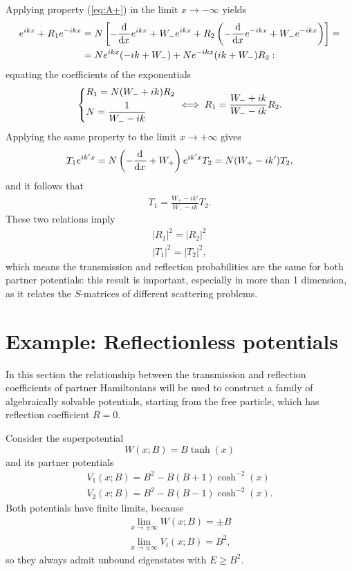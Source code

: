  Applying property (\ref{eq:A+}) in the limit $x\to-\infty$ yields
\begin{gather*}
e^{ikx}+R_1e^{-ikx} = N\left[-\dv[]{}{x}e^{ikx}+W_-e^{ikx} + R_2\left(
-\dv[]{}{x}e^{-ikx}+W_-e^{-ikx}\right)\right]=\\
=Ne^{ikx}(-ik+W_-)+Ne^{-ikx}(ik+W_-)R_2:
\end{gather*}
equating the coefficients of the exponentials
\begin{equation}
\begin{dcases*}
R_1=N(W_-+ik)R_2\\
N=\frac{1}{W_--ik}
\end{dcases*} \iff R_1 = \frac{W_-+ik}{W_--ik}R_2.
\label{eq:refl}
\end{equation}
Applying the same property to the limit $x\to+\infty$ gives
$$T_1e^{ik'x} = N\left(-\dv[]{}{x}+W_+\right)e^{ik'x}T_2 = N(W_+-ik')T_2,$$
and it follows that
\begin{gather}
T_1 = \frac{W_+-ik'}{W_--ik}T_2.
\label{eq:trans}
\end{gather}
 These two relations imply
\begin{gather*}
|R_1|^2 = |R_2|^2\\
|T_1|^2 = |T_2|^2,
\end{gather*}
which means the transmission and reflection probabilities are the same for both partner
potentials: this result is important, especially in more than 1 dimension, as it relates the
$S$-matrices of different scattering problems.
\section{Example: Reflectionless potentials}
\label{sec:refl1}
In this section the relationship between the transmission and reflection coefficients of partner
Hamiltonians will be used to construct a family of algebraically solvable potentials, starting
from the free particle, which has reflection coefficient $R=0$.

Consider the superpotential
$$W(x;B)=B\tanh(x)$$
and its partner potentials
\begin{gather*}
    V_1(x;B)=B^2-B(B+1)\cosh^{-2}(x)\\
    V_2(x;B)=B^2-B(B-1)\cosh^{-2}(x).
\end{gather*}
Both potentials have finite limits, because
\begin{gather*}
\lim\limits_{x\to\pm\infty}W(x;B)=\pm B\\
\lim\limits_{x\to\pm\infty}V_i(x;B)=B^2,
\end{gather*}
so they always admit unbound eigenstates with $E\geq B^2$.\\

